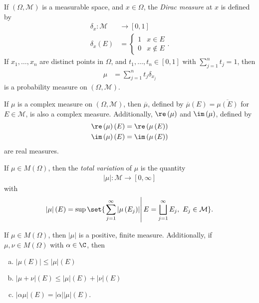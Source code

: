 \begin{definition}
  If $\left(\Omega,\mathcal{M}\right)$ is a measurable space, and $x\in \Omega$, the \textit{Dirac measure} at $x$ is defined by
  \begin{align*}
    \delta_{x}\colon \mathcal{M}&\rightarrow [0,1]\\
    \delta_x\left(E\right) &= \begin{cases}
      1 & x\in E\\
      0 & x\notin E
    \end{cases}.
  \end{align*}
    If $x_1,\dots,x_n$ are distinct points in $\Omega$, and $t_1,\dots,t_n\in [0,1]$ with $\sum_{j=1}^{n}t_j = 1$, then
    \begin{align*}
      \mu &= \sum_{j=1}^{n}t_j\delta_{x_j}
    \end{align*}
    is a probability measure on $\left(\Omega,\mathcal{M}\right)$.
\end{definition}
\begin{fact}
  If $\mu$ is a complex measure on $\left(\Omega,\mathcal{M}\right)$, then $\overline{\mu}$, defined by $\overline{\mu}\left(E\right) = \overline{\mu\left(E\right)}$ for $E\in \mathcal{M}$, is also a complex measure. Additionally, $\re\left(\mu\right)$ and $\im\left(\mu\right)$, defined by
  \begin{align*}
    \re\left(\mu\right)\left(E\right) &= \re\left(\mu\left(E\right)\right)\\
    \im\left(\mu\right)\left(E\right) &= \im\left(\mu\left(E\right)\right)
  \end{align*}
  are real measures.
\end{fact}
\begin{definition}
  If $\mu\in M\left(\Omega\right)$, then the \textit{total variation} of $\mu$ is the quantity
  \begin{align*}
    \left\vert \mu \right\vert\colon \mathcal{M}\rightarrow [0,\infty]
    \end{align*}
    with
    \begin{align*}
    \left\vert \mu \right\vert\left(E\right) = \sup\set{\left.\sum_{j=1}^{\infty}\left\vert \mu\left(E_j\right) \right\vert\right|E = \bigsqcup_{j=1}^{\infty}E_j,~E_j\in\mathcal{M}}.
  \end{align*}
\end{definition}
\begin{fact}
  If $\mu\in M\left(\Omega\right)$, then $\left\vert \mu \right\vert$ is a positive, finite measure. Additionally, if $\mu,\nu\in M\left(\Omega\right)$ with $\alpha\in \C$, then
  \begin{enumerate}[(a)]
    \item $\left\vert \mu\left(E\right) \right\vert\leq \left\vert \mu \right\vert\left(E\right)$
    \item $\left\vert \mu + \nu \right\vert\left(E\right) \leq \left\vert \mu \right\vert\left(E\right) + \left\vert \nu \right\vert\left(E\right)$
    \item $\left\vert \alpha\mu \right\vert\left(E\right) = \left\vert \alpha \right\vert\left\vert \mu \right\vert\left(E\right)$.
  \end{enumerate}
\end{fact}
